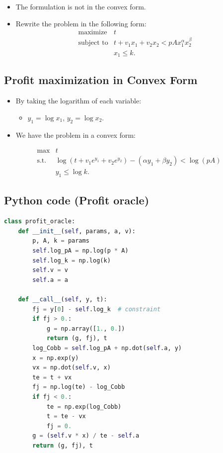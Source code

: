 \documentclass[]{article}
\providecommand{\tightlist}{%
  \setlength{\itemsep}{0pt}\setlength{\parskip}{0pt}}
\begin{document}
\begin{itemize}
\tightlist
\item
  The formulation is not in the convex form.
\item
  Rewrite the problem in the following form: \[\begin{array}{ll}
    \text{maximize} & t \\
    \text{subject to} & t  + v_1 x_1  + v_2 x_2 < p A x_1^{\alpha} x_2^{\beta}\\
                  & x_1 \le k.
    \end{array}\]
\end{itemize}

\hypertarget{profit-maximization-in-convex-form}{%
\subsection{Profit maximization in Convex
Form}\label{profit-maximization-in-convex-form}}

\begin{itemize}
\item
  By taking the logarithm of each variable:

  \begin{itemize}
  \tightlist
  \item
    \(y_1 = \log x_1\), \(y_2 = \log x_2\).
  \end{itemize}
\item
  We have the problem in a convex form:
\end{itemize}

\[\begin{array}{ll}
    \text{max}  & t \\
    \text{s.t.} & \log(t + v_1 e^{y_1} + v_2 e^{y_2}) - (\alpha y_1 + \beta y_2) < \log(pA) \\
                & y_1 \le \log k.
\end{array}\]

\hypertarget{python-code-profit-oracle}{%
\subsection{Python code (Profit
oracle)}\label{python-code-profit-oracle}}

\scriptsize

\begin{lstlisting}[language=Python]
class profit_oracle:
    def __init__(self, params, a, v):
        p, A, k = params
        self.log_pA = np.log(p * A)
        self.log_k = np.log(k)
        self.v = v
        self.a = a

    def __call__(self, y, t):
        fj = y[0] - self.log_k  # constraint
        if fj > 0.:
            g = np.array([1., 0.])
            return (g, fj), t
        log_Cobb = self.log_pA + np.dot(self.a, y)
        x = np.exp(y)
        vx = np.dot(self.v, x)
        te = t + vx
        fj = np.log(te) - log_Cobb
        if fj < 0.:
            te = np.exp(log_Cobb)
            t = te - vx
            fj = 0.
        g = (self.v * x) / te - self.a
        return (g, fj), t
\end{lstlisting}
\end{document}
